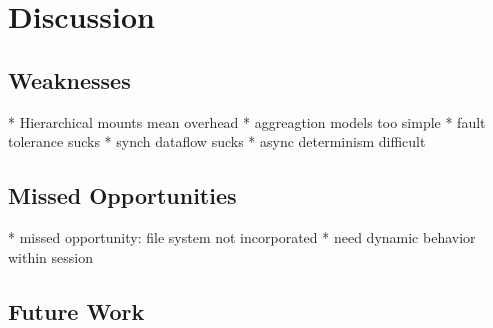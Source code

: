 \section{Discussion}

\subsection{Weaknesses}
* Hierarchical mounts mean overhead
* aggreagtion models too simple
* fault tolerance sucks
* synch dataflow sucks
* async determinism difficult

\subsection{Missed Opportunities}
* missed opportunity: file system not incorporated
* need dynamic behavior within session

\subsection{Future Work} 
